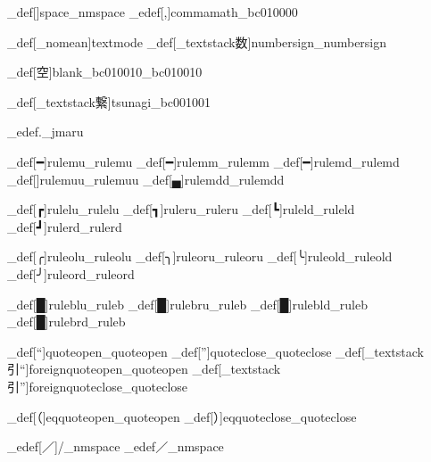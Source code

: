 \brl@char_def[]{space}{\brl@char@alias_nmspace}%
%
\brl@char_edef[,]{commamath}{\brl@char_bc010000}%


%
%
\brl@char_def[\brl@char_nomean]{textmode}{}
%
%
%
%
\brl@char_def[\brl@char_textstack{数}{}]{numbersign}{\brl@char@alias_numbersign}


\brl@char_def[空]{blank}{\brl@char_bc010010\brl@char_bc010010}



\brl@char_def[\brl@char_textstack{繋}{}]{tsunagi}{\brl@char_bc001001}

\brl@char_edef{.}{\brl@char@alias_jmaru}%

\brl@char_def[━]{rulemu}{\brl@char@alias_rulemu}
\brl@char_def[━]{rulemm}{\brl@char@alias_rulemm}
\brl@char_def[━]{rulemd}{\brl@char@alias_rulemd}
\brl@char_def[]{rulemuu}{\brl@char@alias_rulemuu}
\brl@char_def[▄]{rulemdd}{\brl@char@alias_rulemdd}

%

\brl@char_def[┏]{rulelu}{\brl@char@alias_rulelu}
\brl@char_def[┓]{ruleru}{\brl@char@alias_ruleru}
\brl@char_def[┗]{ruleld}{\brl@char@alias_ruleld}
\brl@char_def[┛]{rulerd}{\brl@char@alias_rulerd}

\brl@char_def[╭]{ruleolu}{\brl@char@alias_ruleolu}
\brl@char_def[╮]{ruleoru}{\brl@char@alias_ruleoru}
\brl@char_def[╰]{ruleold}{\brl@char@alias_ruleold}
\brl@char_def[╯]{ruleord}{\brl@char@alias_ruleord}

\brl@char_def[█]{ruleblu}{\brl@char@alias_ruleb}
\brl@char_def[█]{rulebru}{\brl@char@alias_ruleb}
\brl@char_def[█]{rulebld}{\brl@char@alias_ruleb}
\brl@char_def[█]{rulebrd}{\brl@char@alias_ruleb}


\brl@char_def[“]{quoteopen}{\brl@char@alias_quoteopen}
\brl@char_def[”]{quoteclose}{\brl@char@alias_quoteclose}
\brl@char_def[\brl@char_textstack{引}{“}]{foreignquoteopen}{\brl@char@alias_quoteopen}
\brl@char_def[\brl@char_textstack{引}{”}]{foreignquoteclose}{\brl@char@alias_quoteclose}


\brl@char_def[（]{eqquoteopen}{\brl@char@alias_quoteopen}
\brl@char_def[）]{eqquoteclose}{\brl@char@alias_quoteclose}



\brl@char_edef[／]{/}{\brl@char@alias_nmspace}%
\brl@char_edef{／}{\brl@char@alias_nmspace}


